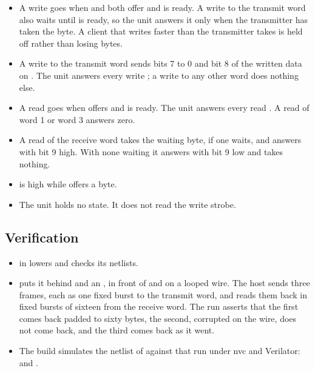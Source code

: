\begin{itemize}
\item A write goes when  and  both offer
and  is ready. A write to the transmit word also waits
until  is ready, so the unit answers it only when the
transmitter has taken the
byte. A client that writes faster than the transmitter takes is held
off rather than losing bytes.
\item A write to the transmit word sends bits 7 to 0 and bit 8 of the
written data on . The unit answers every write
; a write to any other word does nothing else.
\item A read goes when  offers and  is ready.
The unit
answers every read . A read of word 1 or word 3 answers
zero.
\item A read of the receive word takes the waiting byte, if one waits,
and answers with bit 9 high. With none waiting it answers with bit 9
low and takes nothing.
\item {} is high while  offers a byte.
\item The unit holds no state. It does not read the write strobe.
\end{itemize}

\subsection*{Verification}

\begin{itemize}
\item {}
in  lowers  and checks its
netlists.
\item {} puts it behind  and an
, in front of  and  on a looped
wire. The host sends three frames, each as one fixed burst to the
transmit word, and reads them back in fixed bursts of sixteen from the
receive word. The run asserts that the first comes back padded to
sixty bytes, the second, corrupted on the wire, does not come back, and
the third comes back as it went.
\item The build simulates the netlist of  against that
run under nvc and Verilator:
 and
.
\end{itemize}

